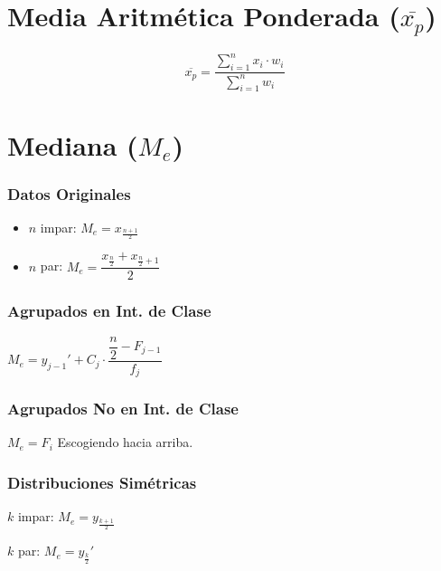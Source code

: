 \documentclass[10pt,letterpaper]{article}
\begin{document}
\section{Media Aritmética Ponderada ($\overline{x_p}$)}
$$ \overline{x_p}=\dfrac{\displaystyle\sum_{i=1}^{n}x_i\cdot w_i }{\displaystyle\sum_{i=1}^{n}w_i} $$

\section{Mediana ($M_e$)}

\begin{multicols}{3}
\subsubsection*{Datos Originales}
\begin{itemize}
\item $n$ impar: $M_e=x_{\frac{n+1}{2}}$
\item $n$ par: $M_e = \dfrac{x_{\frac{n}{2}}+x_{\frac{n}{2}+1}}{2}$
\end{itemize}
\columnbreak
\subsubsection*{Agrupados en Int. de Clase}
\begin{flushleft}
$M_e = y_{j-1}' + C_j \cdot \dfrac{\dfrac{n}{2}-F_{j-1}}{f_j}$
\end{flushleft}
\columnbreak
\subsubsection*{Agrupados No en Int. de Clase}
\begin{flushleft}
$M_e = F_i$ Escogiendo hacia arriba.
\end{flushleft}
\end{multicols}

\subsubsection*{Distribuciones Simétricas}
\begin{multicols}{2}
\begin{flushleft}
$k$ impar: $M_e=y_{\frac{k+1}{2}}$
\end{flushleft}
\columnbreak
\begin{flushleft}
$k$ par: $M_e=y_{\frac{k}{2}}'$
\end{flushleft}
\end{multicols}
\end{document}
